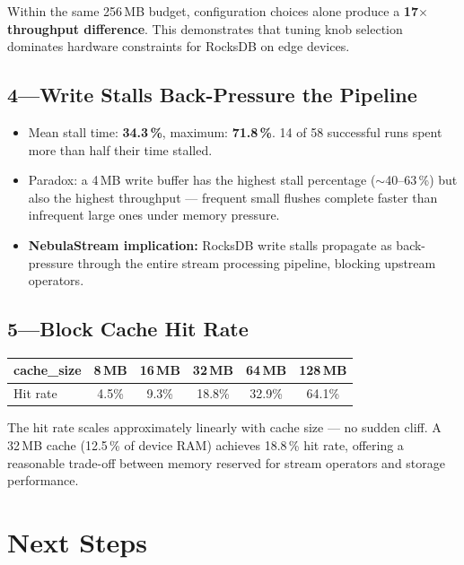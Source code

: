 \documentclass[10pt,a4paper]{scrartcl}
\begin{document}
\smallskip
Within the same 256\,MB budget, configuration choices alone produce a
\textbf{17$\times$ throughput difference}. This demonstrates that tuning knob
selection dominates hardware constraints for RocksDB on edge devices.

\subsection{4\enspace---\enspace Write Stalls Back-Pressure the Pipeline}

\begin{itemize}
  \item Mean stall time: \textbf{34.3\,\%}, maximum: \textbf{71.8\,\%}. 14 of 58 successful runs spent more than half their time stalled.
  \item Paradox: a 4\,MB write buffer has the highest stall percentage ($\sim$40--63\,\%) but also the highest throughput --- frequent small flushes complete faster than infrequent large ones under memory pressure.
  \item \textbf{NebulaStream implication:} RocksDB write stalls propagate as back-pressure through the entire stream processing pipeline, blocking upstream operators.
\end{itemize}

\subsection{5\enspace---\enspace Block Cache Hit Rate}

\begin{tabular}{lccccc}
  \toprule
  \textbf{cache\_size} & \textbf{8\,MB} & \textbf{16\,MB} & \textbf{32\,MB} & \textbf{64\,MB} & \textbf{128\,MB} \\
  \midrule
  Hit rate             & 4.5\%          & 9.3\%           & 18.8\%          & 32.9\%          & 64.1\% \\
  \bottomrule
\end{tabular}

\smallskip
The hit rate scales approximately linearly with cache size --- no sudden cliff.
A 32\,MB cache (12.5\,\% of device RAM) achieves 18.8\,\% hit rate, offering
a reasonable trade-off between memory reserved for stream operators and storage
performance.

\section{Next Steps}
\end{document}
